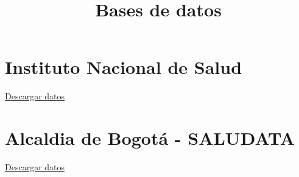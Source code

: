 \documentclass{article}
\title{Bases de datos}
\date{}
\begin{document}
\maketitle

\section*{Instituto Nacional de Salud}

\href{https://www.datos.gov.co/api/views/gt2j-8ykr/rows.csv?accessType=DOWNLOAD}{Descargar datos}

\section*{Alcaldia de Bogotá - SALUDATA}
\href{http://saludata.saludcapital.gov.co/osb/datos_abiertos_osb/enf-transmisibles/OSB_EnfTransm-COVID-19.csv}{Descargar datos}
\end{document}
